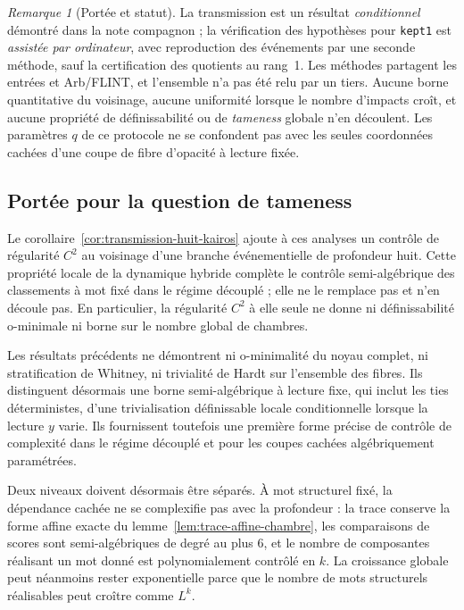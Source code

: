 \documentclass[11pt,a4paper]{article}
\theoremstyle{definition}
\theoremstyle{remark}
\newtheorem{remark}[definition]{Remarque}
\begin{document}
\begin{remark}[Portée et statut]
La transmission est un résultat \emph{conditionnel} démontré dans la note compagnon ; la vérification des hypothèses pour \texttt{kept1} est \emph{assistée par ordinateur}, avec reproduction des événements par une seconde méthode, sauf la certification des quotients au rang~1. Les méthodes partagent les entrées et Arb/FLINT, et l'ensemble n'a pas été relu par un tiers. Aucune borne quantitative du voisinage, aucune uniformité lorsque le nombre d'impacts croît, et aucune propriété de définissabilité ou de \emph{tameness} globale n'en découlent. Les paramètres $q$ de ce protocole ne se confondent pas avec les seules coordonnées cachées d'une coupe de fibre d'opacité à lecture fixée.
\end{remark}

\subsection{Portée pour la question de tameness}

Le corollaire~\ref{cor:transmission-huit-kairos} ajoute à ces analyses un contrôle de régularité $C^2$ au voisinage d'une branche événementielle de profondeur huit. Cette propriété locale de la dynamique hybride complète le contrôle semi-algébrique des classements à mot fixé dans le régime découplé ; elle ne le remplace pas et n'en découle pas. En particulier, la régularité $C^2$ à elle seule ne donne ni définissabilité o-minimale ni borne sur le nombre global de chambres.

Les résultats précédents ne démontrent ni o-minimalité du noyau complet, ni stratification de Whitney, ni trivialité de Hardt sur l'ensemble des fibres. Ils distinguent désormais une borne semi-algébrique à lecture fixe, qui inclut les ties déterministes, d'une trivialisation définissable locale conditionnelle lorsque la lecture $y$ varie. Ils fournissent toutefois une première forme précise de contrôle de complexité dans le régime découplé et pour les coupes cachées algébriquement paramétrées.

Deux niveaux doivent désormais être séparés. À mot structurel fixé, la dépendance cachée ne se complexifie pas avec la profondeur : la trace conserve la forme affine exacte du lemme~\ref{lem:trace-affine-chambre}, les comparaisons de scores sont semi-algébriques de degré au plus $6$, et le nombre de composantes réalisant un mot donné est polynomialement contrôlé en $k$. La croissance globale peut néanmoins rester exponentielle parce que le nombre de mots structurels réalisables peut croître comme $L^k$.
\end{document}
